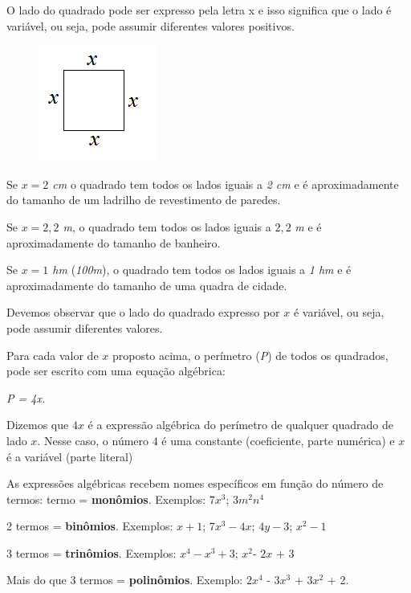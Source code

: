 \begin{texemplo}

O lado do quadrado pode ser expresso pela letra  x  e isso significa que o lado é variável, ou seja, pode assumir diferentes valores positivos.

\begin{figure}[H]
\includegraphics{capitulos/expressoes_algebricas/media/image2.png}
\centering
\end{figure}

Se \textit{$x = 2$ cm} o quadrado tem todos os lados iguais a \textit{2 cm} e é aproximadamente do tamanho de um ladrilho de revestimento de paredes.

Se \textit{$x = 2,2$ m}, o quadrado tem todos os lados iguais a $2,2$ \textit{m} e é aproximadamente do tamanho de banheiro.

Se \textit{$x = 1$ hm} (\textit{100m}), o quadrado tem todos os lados iguais a \textit{1 hm} e é aproximadamente do tamanho de uma quadra de cidade.

Devemos observar que o lado do quadrado expresso por $x$ é variável, ou seja, pode assumir diferentes valores.

Para cada valor de $x$ proposto acima, o perímetro (\textit{P}) de todos os quadrados, pode ser escrito com uma equação algébrica:

\begin{center}
\textit{P = 4x.}
\end{center}

Dizemos que $4x$ é a expressão algébrica do perímetro de qualquer quadrado de lado $x$. Nesse caso, o número $4$ é uma constante (coeficiente, parte numérica) e $x$ é a variável (parte literal) \qedsymbol

As expressões algébricas recebem nomes específicos em função do número de termos:\linebreak \linebreak
{} termo = \textbf{monômios}. Exemplos: $7x^3$; $3m^2n^4$\par
2 termos = \textbf{binômios}. Exemplos:  $x+1$; $7x^3 -4x$; $4y - 3$; $x^2 - 1$\par
3 termos = \textbf{trinômios}. Exemplos: $x^4 - x^3 + 3$; $x^2$- $2x$ + 3\par
Mais do que 3 termos = \textbf{polinômios}. Exemplo: $2x^4$ - $3x^3$ + $3x^2$ + 2.
\end{texemplo}


